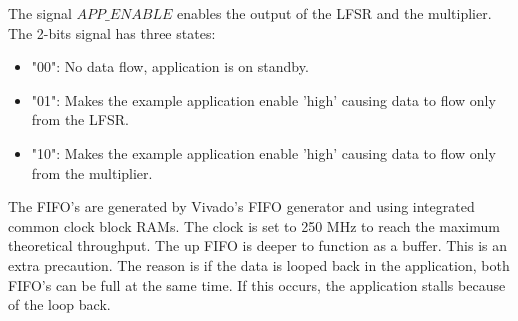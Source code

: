 The signal $APP\_ENABLE$ enables the output of the LFSR and the multiplier. The 2-bits signal has three states:
\begin{itemize}
	\item "00": No data flow, application is on standby.
	\item "01": Makes the example application enable 'high' causing data to flow only from the LFSR.
	\item "10": Makes the example application enable 'high' causing data to flow only from the multiplier.
\end{itemize}
The FIFO's are generated by Vivado's FIFO generator and using integrated common clock block RAMs. The clock is set to 250 MHz to reach the maximum theoretical throughput. The up FIFO is deeper to function as a buffer. This is an extra precaution. The reason is if the data is looped back in the application, both FIFO's can be full at the same time. If this occurs, the application stalls because of the loop back.

\newpage